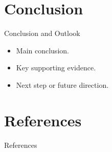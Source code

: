 \documentclass[hyperref={bookmarks=false},aspectratio=169]{beamer}
\begin{document}
\section{Conclusion}

\begin{frame}{Conclusion and Outlook}
  \begin{itemize}
    \item Main conclusion.
    \item Key supporting evidence.
    \item Next step or future direction.
  \end{itemize}
\end{frame}

\section{References}

\begin{frame}[allowframebreaks]{References}
  \printbibliography[title=References]
\end{frame}
\end{document}
